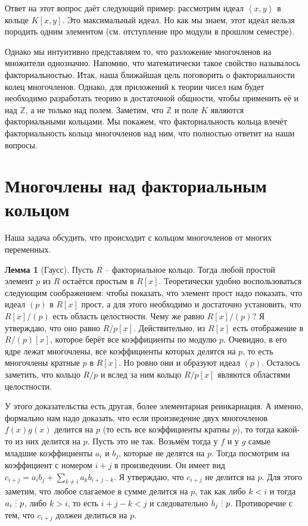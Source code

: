 \documentclass[10pt,a4paper,oneside]{book}
\theoremstyle{definition}
\newtheorem{lem}{Лемма}
\newcommand{\mb}[1]{\mathbb{#1}}
\newcommand{\di}{\mathop{\,\scalebox{0.85}{\raisebox{-1.2pt}[0.5\height]{\vdots}}\,}}
\def\lan{\left\langle }
\def\ran{\right\rangle}
\def\lm{\begin{lem}}
\def\elm{\end{lem}}
\begin{document}
Ответ на этот вопрос даёт следующий пример: рассмотрим идеал $\lan x,y \ran$ в кольце $K[x,y]$. Это максимальный идеал. Но как мы знаем, этот идеал нельзя породить одним элементом (см. отступление про модули в прошлом семестре). 

Однако мы интуитивно представляем то, что разложение многочленов на множители однозначно. Напомню, что математически такое свойство называлось факториальностью. Итак, наша ближайшая цель поговорить о факториальности колец многочленов. Однако, для приложений к теории чисел нам будет необходимо разработать теорию в достаточной общности, чтобы применить её и над $\mb Z$, а не только над полем. Заметим, что $\mb Z$ и поле $K$ являются факториальными кольцами. Мы покажем, что факториальность кольца влечёт факториальность кольца многочленов над ним, что полностью ответит на наши вопросы.



\section{Многочлены над факториальным кольцом}

Наша задача обсудить, что происходит с кольцом многочленов от многих переменных.


\lm[Гаусс] Пусть $R$ -- факториальное кольцо. Тогда любой простой элемент $p$ из $R$ остаётся простым в $R[x]$.
\proof
Теоретически удобно воспользоваться следующим соображением: чтобы показать, что элемент прост надо показать, что идеал $(p)$ в $R[x]$ прост, а для этого необходимо и достаточно установить, что $R[x]/(p)$ есть область целостности. Чему же равно $R[x]/(p)$? Я утверждаю, что оно равно $R/p[x]$. Действительно, из $R[x]$ есть отображение в $R/(p)[x]$, которое берёт все коэффициенты по модулю $p$. Очевидно, в его ядре лежат многочлены, все коэффициенты которых делятся на $p$, то есть многочлены кратные $p$ в $R[x]$. Но ровно они и образуют идеал $(p)$. Осталось заметить, что кольцо $R/p$ и вслед за ним кольцо $R/p[x]$ являются областями целостности.

У этого доказательства есть другая, более элементарная реинкарнация. А именно, формально нам надо доказать, что если произведение двух многочленов $f(x)g(x)$ делится на $p$ (то есть все коэффициенты кратны $p$), то тогда какой-то из них делится на $p$. Пусть это не так. Возьмём тогда у $f$ и у $g$ самые младшие коэффициенты $a_i$ и  $b_j$, которые не делятся на $p$. Тогда посмотрим на коэффициент с номером $i+j$  в произведении. Он имеет вид $c_{i+j}= a_ib_j + \sum_{k \neq i} a_k b_{i+j -k}$. Я утверждаю, что $c_{i+j}$ не делится на $p$. Для этого заметим, что любое слагаемое в сумме делится на $p$, так как либо $k<i$ и тогда $a_i \di p$, либо $k>i$, то есть $i+j-k<j$ и следовательно $b_j \di p$. Противоречие с тем, что $c_{i+j}$ должен делиться на $p$.   
\endproof
\elm
\end{document}
